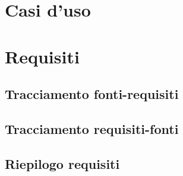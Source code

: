 \documentclass[a4paper,titlepage]{article}
\begin{document}
 \section{Casi d'uso}
  
  

  \newpage
 \section{Requisiti}
  
  
  \subsection{Tracciamento fonti-requisiti}
   
  \subsection{Tracciamento requisiti-fonti}
   
  \subsection{Riepilogo requisiti}
   
\end{document}
